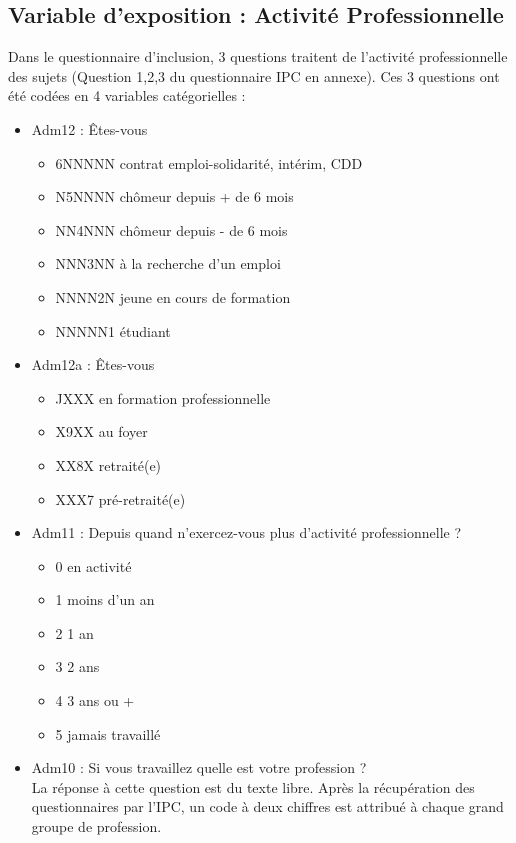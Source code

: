 \documentclass{book}
\begin{document}
\subsection{Variable d'exposition : Activité Professionnelle}
\noindent
Dans le questionnaire d'inclusion, 3 questions traitent de l'activité professionnelle des sujets (Question 1,2,3 du questionnaire IPC en annexe). Ces 3 questions ont été codées en 4 variables catégorielles :

\begin{small}
\begin{itemize}[label=\textbullet]
\item Adm12 : Êtes-vous
\begin{itemize}[label=\textbullet]
\item 6NNNNN  contrat emploi-solidarité, intérim, CDD
\item N5NNNN  chômeur depuis + de 6 mois
\item NN4NNN  chômeur depuis - de 6 mois
\item NNN3NN  à la recherche d'un emploi
\item NNNN2N  jeune en cours de formation
\item NNNNN1  étudiant
\end{itemize}

\bigskip

\item Adm12a : Êtes-vous
\begin{itemize}[label=\textbullet, font=\small]
\item JXXX  en formation professionnelle
\item X9XX  au foyer
\item XX8X  retraité(e)
\item XXX7  pré-retraité(e)
\end{itemize}

\bigskip

\item Adm11 : Depuis quand n'exercez-vous plus d'activité professionnelle ?
\begin{itemize}[label=\textbullet, font=\small]
\item 0	en activité
\item 1	moins d'un an
\item 2	1 an
\item 3	2 ans
\item 4	3 ans ou +
\item 5	jamais travaillé
\end{itemize}


\bigskip

\item Adm10 : Si vous travaillez quelle est votre profession ? \\
La réponse à cette question est du texte libre. Après la récupération des questionnaires par l'IPC, un code à deux chiffres est attribué à chaque grand groupe de profession. 
\end{itemize}
\end{small}
\end{document}
